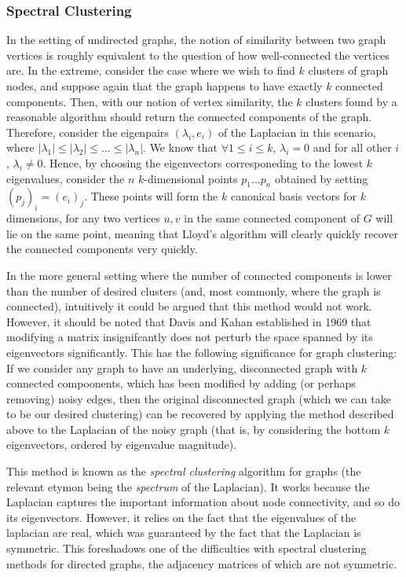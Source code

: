 \subsubsection{Spectral Clustering}
In the setting of undirected graphs, the notion of similarity between two graph vertices is roughly 
equivalent to the question of how well-connected the vertices are. In the extreme, consider the case
where we wish to find $k$ clusters of graph nodes, and suppose again that the graph happens to have 
exactly $k$ connected components. Then, with our notion of vertex similarity, the $k$ clusters 
found by a reasonable algorithm should return the connected components of the graph. Therefore, 
consider the eigenpairs $(\lambda_i, e_i)$ of the Laplacian in this scenario, where $|\lambda_1| 
\leq |\lambda_2| \leq \hdots \leq |\lambda_n|$. We know that $\forall 1\leq i \leq k$, $\lambda_i 
=0$ and for all other $i$, $\lambda_i \neq 0$. Hence, by choosing the eigenvectors corresponeding
to the lowest $k$ eigenvalues, consider the $n$ $k$-dimensional points $p_1 \hdots p_n$ obtained by
setting $(p_j)_i = (e_i)_j$. These points will form the $k$ canonical basis vectors for $k$ 
dimensions, for any two vertices $u,v$ in the same connected component of $G$ will lie on the same 
point, meaning that Lloyd's algorithm will clearly quickly recover the connected components very 
quickly.

In the more general setting where the number of connected components is lower than the number of 
desired clusters (and, most commonly, where the graph is connected), intuitively it could be 
argued that this method would not work. However, it should be noted that Davis and Kahan 
established in 1969 that modifying a matrix insignifcantly does not perturb the space spanned by 
its eigenvectors significantly. This has the following significance for graph clustering: If we 
consider any graph to have an underlying, disconnected graph with $k$ connected compoonents, which
has been modified by adding (or perhaps removing) noisy edges, then the original disconnected graph
(which we can take to be our desired clustering) can be recovered by applying the method described 
above to the Laplacian of the noisy graph (that is, by considering the bottom $k$ eigenvectors, 
ordered by eigenvalue magnitude).

This method is known as the \emph{spectral clustering} algorithm for graphs (the relevant etymon 
being the \emph{spectrum} of the Laplacian). It works because the Laplacian captures the important 
information about node connectivity, and so do its eigenvectors. However, it relies on the fact that
the eigenvalues of the laplacian are real, which was guaranteed by the fact that the Laplacian is 
symmetric. This foreshadows one of the difficulties with spectral clustering methods for directed 
graphs, the adjacency matrices of which are not symmetric.

